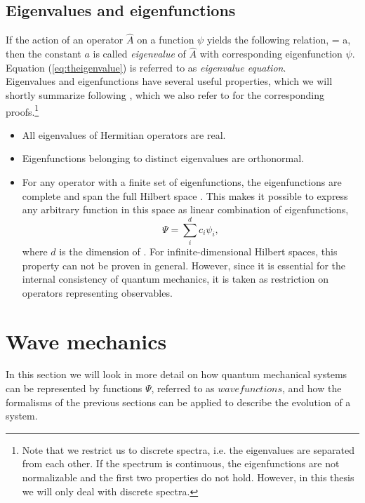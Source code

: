 \subsection{Eigenvalues and eigenfunctions}
If the action of an operator $\hat{A}$ on a function $\psi$ yields the following relation,
\be 
{}\psi = a\psi,
\label{eq:theigenvalue} 
\ee
then the constant $a$ is called \textit{eigenvalue} of $\hat{A}$ with corresponding eigenfunction $\psi$. Equation (\ref{eq:theigenvalue}) is referred to as \textit{eigenvalue equation}. \\
Eigenvalues and eigenfunctions have several useful properties, which we will shortly summarize following \cite{griffiths2005introduction}, which we also refer to for the corresponding proofs.\footnote{Note that we restrict us to discrete spectra, i.e. the eigenvalues are separated from each other. If the spectrum is continuous, the eigenfunctions are not normalizable and the first two properties do not hold. However, in this thesis we will only deal with discrete spectra.}
\begin{itemize}
\item All eigenvalues of Hermitian operators are real.
\item Eigenfunctions belonging to distinct eigenvalues are orthonormal.
\item For any operator with a finite set of eigenfunctions, the eigenfunctions are complete and span the full Hilbert space \hilbert. 
This makes it possible to express any arbitrary function in this space as linear combination of eigenfunctions,
\[
\Psi = \sum_i^d c_i\psi_i,
\]
where $d$ is the dimension of \hilbert. For infinite-dimensional Hilbert spaces, this property can not be proven in general. However, since it is essential for the internal consistency of quantum mechanics, it is taken as restriction on operators representing observables.  
\end{itemize}

\section{Wave mechanics}
\label{sec:wf}
In this section we will look in more detail on how quantum mechanical systems can be represented by functions $\Psi$, referred to as $wave functions$, and how the formalisms of the previous sections can be applied to describe the evolution of a system. 


